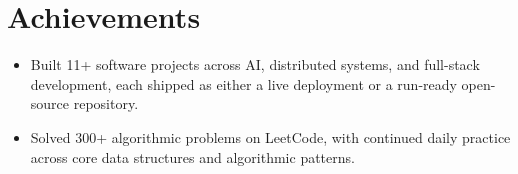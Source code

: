 \documentclass[letterpaper,10pt]{article}
\newcommand{\resumeItem}[1]{
  \item\small{
    {#1 \vspace{-2pt}}
  }
}
\newcommand{\resumeItemListStart}{\begin{itemize}}
\newcommand{\resumeItemListEnd}{\end{itemize}\vspace{-5pt}}
\begin{document}
\section{Achievements}
      \resumeItemListStart
\resumeItem{Built 11+ software projects across AI, distributed systems, and full-stack development, each shipped as either a live deployment or a run-ready open-source repository.}
  \vspace{-16pt}
\resumeItem{Solved 300+ algorithmic problems on LeetCode, with continued daily practice across core data structures and algorithmic patterns.}
     \resumeItemListEnd
\end{document}
